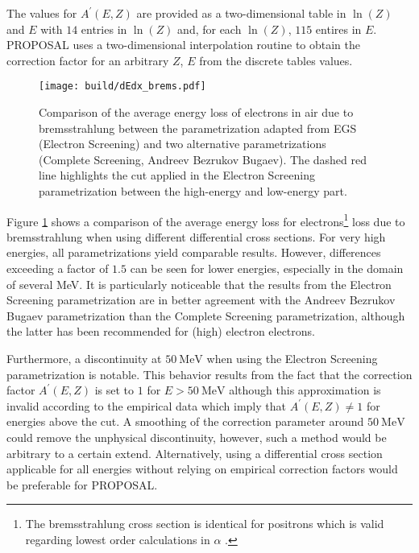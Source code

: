 The values for $A^{\prime}(E,Z)$ are provided as a two-dimensional table in $\ln(Z)$ and $E$ with $\num{14}$ entries in $\ln(Z)$ and, for each $\ln(Z)$, $\num{115}$ entires in $E$.  
PROPOSAL uses a two-dimensional interpolation routine to obtain the correction factor for an arbitrary $Z$, $E$ from the discrete tables values.

\begin{figure}
    \centering
    \texttt{[image: build/dEdx\_brems.pdf]}
    \caption{Comparison of the average energy loss of electrons in air due to bremsstrahlung between the parametrization adapted from EGS (Electron Screening) and two alternative parametrizations (Complete Screening, Andreev Bezrukov Bugaev). The dashed red line highlights the cut applied in the Electron Screening parametrization between the high-energy and low-energy part.}
    \label{fig:dEdx_brems}
\end{figure}


Figure \ref{fig:dEdx_brems} shows a comparison of the average energy loss for electrons\footnote{The bremsstrahlung cross section is identical for positrons which is valid regarding lowest order calculations in $\alpha$ \cite{RevModPhys.46.815}.} loss due to bremsstrahlung when using different differential cross sections.
For very high energies, all parametrizations yield comparable results.
However, differences exceeding a factor of $\num{1.5}$ can be seen for lower energies, especially in the domain of several \si{\mega\electronvolt}.
It is particularly noticeable that the results from the Electron Screening parametrization are in better agreement with the Andreev Bezrukov Bugaev parametrization than the Complete Screening parametrization, although the latter has been recommended for (high) electron electrons.

Furthermore, a discontinuity at $\SI{50}{\mega\electronvolt}$ when using the Electron Screening parametrization is notable.
This behavior results from the fact that the correction factor $A^{\prime}(E,Z)$ is set to $1$ for $E > \SI{50}{\mega\electronvolt}$ although this approximation is invalid according to the empirical data which imply that $A^{\prime}(E,Z) \neq 1$ for energies above the cut.
A smoothing of the correction parameter around $\SI{50}{\mega\electronvolt}$ could remove the unphysical discontinuity, however, such a method would be arbitrary to a certain extend.
Alternatively, using a differential cross section applicable for all energies without relying on empirical correction factors would be preferable for PROPOSAL. 


